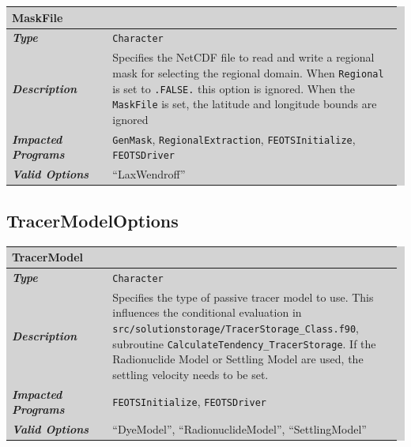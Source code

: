 \documentclass{softwaremanual}
\begin{document}
\noindent\begingroup\setlength{\fboxsep}{0pt}
\colorbox{lightgray}{
\begin{tabular}{p{0.25\linewidth} p{0.725\linewidth}}
\toprule
\textbf{MaskFile} & \\
\midrule
\textbf{\textit{Type}} & \texttt{Character} \\
\midrule
\textbf{\textit{Description}} & Specifies the NetCDF file to read and write a regional mask for selecting the regional domain. When \texttt{Regional} is set to \texttt{.FALSE.} this option is ignored. When the \texttt{MaskFile} is set, the latitude and longitude bounds are ignored  \\
\midrule
\textbf{\textit{Impacted Programs}} & \texttt{GenMask}, \texttt{RegionalExtraction}, \texttt{FEOTSInitialize}, \texttt{FEOTSDriver} \\
\midrule
\textbf{\textit{Valid Options}}  & ``LaxWendroff'' \\
\bottomrule
\end{tabular}
}\endgroup

\subsection{TracerModelOptions}

\noindent\begingroup\setlength{\fboxsep}{0pt}
\colorbox{lightgray}{
\begin{tabular}{p{0.25\linewidth} p{0.725\linewidth}}
\toprule
\textbf{TracerModel} & \\
\midrule
\textbf{\textit{Type}} & \texttt{Character} \\
\midrule
\textbf{\textit{Description}} & Specifies the type of passive tracer model to use. This influences the conditional evaluation in \texttt{src/solutionstorage/TracerStorage\_Class.f90}, subroutine \texttt{CalculateTendency\_TracerStorage}. If the Radionuclide Model or Settling Model are used, the settling velocity needs to be set. \\
\midrule
\textbf{\textit{Impacted Programs}} & \texttt{FEOTSInitialize}, \texttt{FEOTSDriver} \\
\midrule
\textbf{\textit{Valid Options}}  & ``DyeModel'', ``RadionuclideModel'', ``SettlingModel'' \\
\bottomrule
\end{tabular}
}\endgroup
\end{document}
